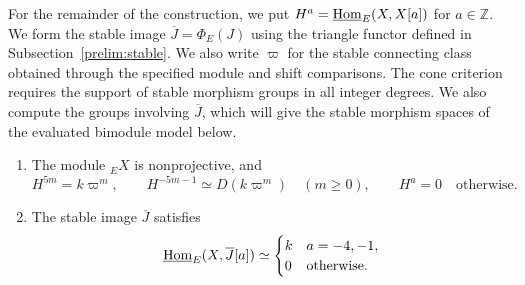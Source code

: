 \documentclass[11pt]{article}
\begin{document}
For the remainder of the construction, we put
$H^a=\underline{{\rm Hom}}_E(X,X[a])$ for $a\in\mathbb Z$.
We form the stable image $\overline J=\Phi_E(J)$ using the triangle functor defined in
Subsection~\ref{prelim:stable}. We also write $\varpi$ for the stable connecting
class obtained through the specified module and shift comparisons.
The cone criterion requires the support of stable morphism groups in
all integer degrees. We also compute the groups involving $\overline J$,
which will give the stable morphism spaces of the evaluated bimodule
model below.

\begin{Prop}\label{ind:Tate-and-middle}
\leavevmode
\begin{enumerate}
\item\label{ind:Tate-self} The module ${_E}X$ is nonprojective, and
\begin{equation*}
 H^{5m}=k\varpi^m,\qquad H^{-5m-1}\simeq D(k\varpi^m)\quad(m\ge0),
 \qquad H^a=0\quad\text{otherwise}.
\end{equation*}
\item\label{ind:Tate-middle} The stable image $\overline J$ satisfies
\begin{equation*}
 \underline{{\rm Hom}}_E(X,\overline J[a])\simeq
 \begin{cases}k&a=-4,-1,\\0&\text{otherwise}.
 \end{cases}
\end{equation*}
\end{enumerate}
\end{Prop}
\end{document}
